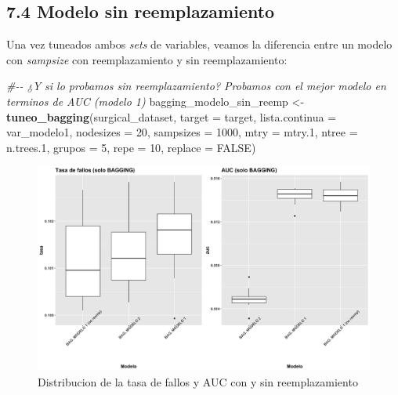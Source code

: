 \documentclass[
]{article}
\newenvironment{Shaded}{\begin{snugshade}}{\end{snugshade}}
\newcommand{\CommentTok}[1]{\textcolor[rgb]{0.56,0.35,0.01}{\textit{#1}}}
\newcommand{\DataTypeTok}[1]{\textcolor[rgb]{0.13,0.29,0.53}{#1}}
\newcommand{\DecValTok}[1]{\textcolor[rgb]{0.00,0.00,0.81}{#1}}
\newcommand{\FloatTok}[1]{\textcolor[rgb]{0.00,0.00,0.81}{#1}}
\newcommand{\KeywordTok}[1]{\textcolor[rgb]{0.13,0.29,0.53}{\textbf{#1}}}
\newcommand{\NormalTok}[1]{#1}
\newcommand{\OtherTok}[1]{\textcolor[rgb]{0.56,0.35,0.01}{#1}}
\newcommand{\StringTok}[1]{\textcolor[rgb]{0.31,0.60,0.02}{#1}}
\begin{document}
\hypertarget{modelo-sin-reemplazamiento}{%
\subsection{7.4 Modelo sin
reemplazamiento}\label{modelo-sin-reemplazamiento}}

Una vez tuneados ambos \emph{sets} de variables, veamos la diferencia
entre un modelo con \emph{sampsize} con reemplazamiento y sin
reemplazamiento:

\begin{Shaded}
\begin{Highlighting}[]
\CommentTok{\#{-}{-} ¿Y si lo probamos sin reemplazamiento? Probamos con el mejor modelo en terminos de AUC (modelo 1)}
\NormalTok{bagging\_modelo\_sin\_reemp <{-}}\StringTok{ }\KeywordTok{tuneo\_bagging}\NormalTok{(surgical\_dataset, }\DataTypeTok{target =}\NormalTok{ target,}
                                   \DataTypeTok{lista.continua =}\NormalTok{ var\_modelo1, }\DataTypeTok{nodesizes =} \DecValTok{20}\NormalTok{, }
                                   \DataTypeTok{sampsizes =} \DecValTok{1000}\NormalTok{, }\DataTypeTok{mtry =}\NormalTok{ mtry}\FloatTok{.1}\NormalTok{, }\DataTypeTok{ntree =}\NormalTok{ n.trees}\FloatTok{.1}\NormalTok{, }
                                   \DataTypeTok{grupos =} \DecValTok{5}\NormalTok{, }\DataTypeTok{repe =} \DecValTok{10}\NormalTok{, }\DataTypeTok{replace =} \OtherTok{FALSE}\NormalTok{)}
\end{Highlighting}
\end{Shaded}

\begin{figure}[h!]

{\centering \includegraphics[width=0.99\linewidth,height=0.99\textheight,]{./charts/bagging/03_comparacion_final_bagging} 

}

\caption{Distribucion de la tasa de fallos y AUC con y sin reemplazamiento}\label{fig:unnamed-chunk-81}
\end{figure}
\end{document}
